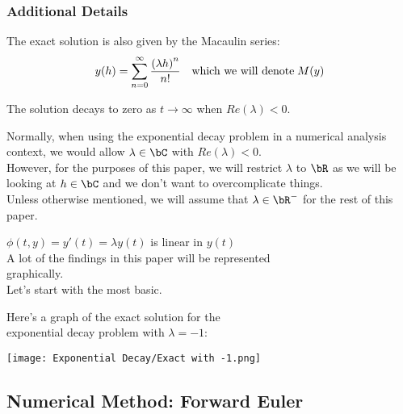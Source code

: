 \subsubsection{Additional Details}
\begin{multicols}{2}
The exact solution is also given by the Macaulin series:
\[y(h) = \sum\limits_{n=0}^{\infty} \frac{{(\lambda h)}^n}{n!} \quad\text{which we will denote}\; M(y)\]

The solution decays to zero as $t \rightarrow \infty$ when $Re(\lambda) < 0$.\\

\par Normally, when using the exponential decay problem in a numerical analysis context, we would allow $\lambda \in \bC$ with $Re(\lambda)<0$.\\
However, for the purposes of this paper, we will restrict $\lambda$ to $\bR$ as we will be looking at $h \in \bC$ and we don't want to overcomplicate things.\\
Unless otherwise mentioned, we will assume that $\lambda \in \bR^{-}$ for the rest of this paper.\\

\par $\phi(t, y) = y'(t) = \lambda y(t)$ is linear in $y(t)$\\

\columnbreak{}
\hspace*{0.75cm}
A lot of the findings in this paper will be represented\\
\hspace*{0.75cm}
graphically.\\
\hspace*{0.75cm}
Let's start with the most basic.\\
\par \hspace*{0.75cm}
Here's a graph of the exact solution for the\\ 
\hspace*{0.75cm}
exponential decay problem with $\lambda = -1$:
\begin{center}
\texttt{[image: Exponential Decay/Exact with -1.png]}
\end{center}
\end{multicols}

\newpage
\subsection{Numerical Method: Forward Euler}

